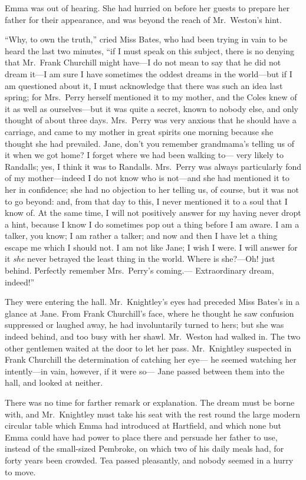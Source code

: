 Emma was out of hearing.  She had hurried on before her guests
to prepare her father for their appearance, and was beyond the reach
of Mr.\ Weston's hint.

``Why, to own the truth,'' cried Miss Bates, who had been trying in vain
to be heard the last two minutes, ``if I must speak on this subject,
there is no denying that Mr.\ Frank Churchill might have---I do not
mean to say that he did not dream it---I am sure I have sometimes
the oddest dreams in the world---but if I am questioned about it,
I must acknowledge that there was such an idea last spring;
for Mrs.\ Perry herself mentioned it to my mother, and the Coles
knew of it as well as ourselves---but it was quite a secret,
known to nobody else, and only thought of about three days.
Mrs.\ Perry was very anxious that he should have a carriage, and came
to my mother in great spirits one morning because she thought she
had prevailed.  Jane, don't you remember grandmama's telling us
of it when we got home?  I forget where we had been walking to---%
very likely to Randalls; yes, I think it was to Randalls.
Mrs.\ Perry was always particularly fond of my mother---indeed I do
not know who is not---and she had mentioned it to her in confidence;
she had no objection to her telling us, of course, but it was not
to go beyond:  and, from that day to this, I never mentioned it
to a soul that I know of.  At the same time, I will not positively
answer for my having never dropt a hint, because I know I do
sometimes pop out a thing before I am aware.  I am a talker,
you know; I am rather a talker; and now and then I have let a thing
escape me which I should not.  I am not like Jane; I wish I were.
I will answer for it \emph{she} never betrayed the least thing in the world.
Where is she?---Oh! just behind.  Perfectly remember Mrs.\ Perry's coming.---%
Extraordinary dream, indeed!''

They were entering the hall.  Mr.\ Knightley's eyes had preceded
Miss Bates's in a glance at Jane.  From Frank Churchill's face,
where he thought he saw confusion suppressed or laughed away,
he had involuntarily turned to hers; but she was indeed behind,
and too busy with her shawl.  Mr.\ Weston had walked in.  The two
other gentlemen waited at the door to let her pass.  Mr.\ Knightley
suspected in Frank Churchill the determination of catching her eye---%
he seemed watching her intently---in vain, however, if it were so---%
Jane passed between them into the hall, and looked at neither.

There was no time for farther remark or explanation.  The dream must
be borne with, and Mr.\ Knightley must take his seat with the rest round
the large modern circular table which Emma had introduced at Hartfield,
and which none but Emma could have had power to place there and
persuade her father to use, instead of the small-sized Pembroke,
on which two of his daily meals had, for forty years been crowded.
Tea passed pleasantly, and nobody seemed in a hurry to move.

